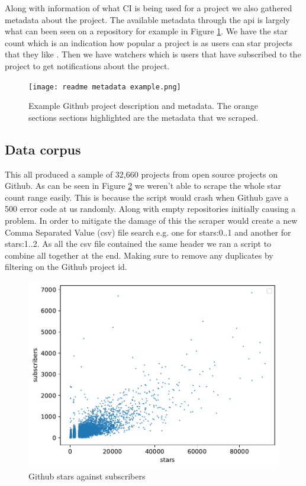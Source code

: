 \documentclass[twoside,12pt,titlepage,a4paper]{article}
\begin{document}
Along with information of what CI is being used for a project we also gathered metadata about the project. The available metadata through the api is largely what can been seen on a repository for example in Figure \ref{ExampleGithubMetaData}. We have the star count which is an indication how popular a project is as users can star projects that they like \citet{Borges2016}. Then we have watchers which is users that have subscribed to the project to get notifications about the project. 

\begin{figure}[h]
  \centering
  \texttt{[image: readme metadata example.png]}
  \caption[alt text]{Example Github project description and metadata\cite{GithubMetaDataExample}. The orange sections sections highlighted are the metadata that we scraped.}
  \label{ExampleGithubMetaData}
\end{figure}

\vspace*{-0.05in}
\subsection{Data corpus}
\label{section:corpus}
\vspace*{-0.05in}
This all produced a sample of 32,660 projects from open source projects on Github. As can be seen in Figure \ref{graph_scatter_stars_vs_subs} we weren't able to scrape the whole star count range easily. This is because the script would crash when Github gave a 500 error code at us randomly. Along with empty repositories initially causing a problem. In order to mitigate the damage of this the scraper would create a new Comma Separated Value (csv) file search e.g. one for stars:0..1 and another for stars:1..2. As all the csv file contained the same header we ran a script to combine all together at the end. Making sure to remove any duplicates by filtering on the Github project id.

\begin{figure}[!htbp]
  \centering
  \includegraphics[width=\textwidth]{../src/results/sub vs stars.pdf}
  \caption[alt text]{Github stars against subscribers}
  \label{graph_scatter_stars_vs_subs}
\end{figure}
\end{document}
